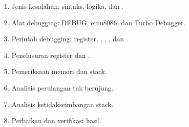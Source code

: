 \documentclass[../../main.tex]{subfiles}
\begin{document}
\begin{materibox}
\vspace{1.1em}
\begin{enumerate}
    \item Jenis kesalahan: sintaks, logika, dan .
    \item Alat debugging: DEBUG, emu8086, dan Turbo Debugger.
    \item Perintah debugging: register, ,
          , , dan .
    \item Penelusuran register dan .
    \item Pemeriksaan memori dan stack.
    \item Analisis perulangan tak berujung.
    \item Analisis ketidakseimbangan stack.
    \item Perbaikan dan verifikasi hasil.
\end{enumerate}
\end{materibox}










\end{document}
